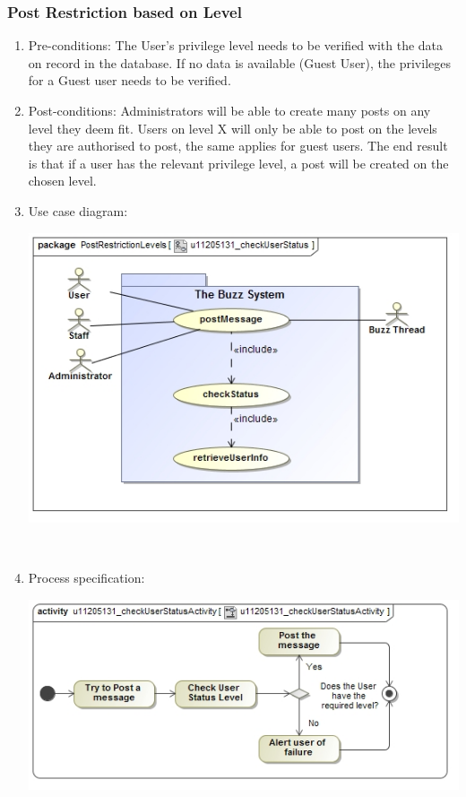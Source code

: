 \documentclass[hidelinks, 12pt, oneside]{article}
\begin{document}
\subsubsection{Post Restriction based on Level}
\begin{enumerate}
	\item Pre-conditions: The User's privilege level needs to be verified with the data on record in the database. If no data is available (Guest User), the privileges for a Guest user needs to be verified.
 
	\item Post-conditions: Administrators will be able to create many posts on any level they deem fit. Users on level X will only be able to post on the levels they are authorised to post, the same applies for guest users. The end result is that if a user has the relevant privilege level, a post will be created on the chosen level.
 
	 
  \item Use case diagram:\\ 
	\centerline{\includegraphics[scale=0.7]{u11205131_checkUserStatus}}\\
	\item Process specification:\\ 
	\centerline{\includegraphics[scale=0.7]{u11205131_checkUserStatusActivity}}
\end{enumerate}
\end{document}
